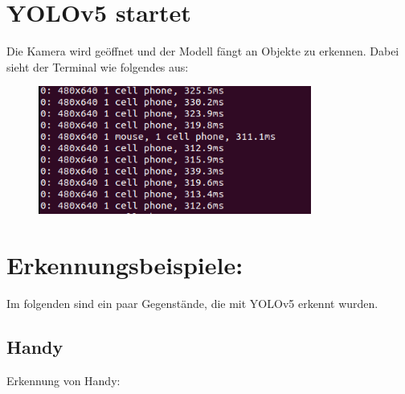 \documentclass{article}
\begin{document}


\clearpage
\section{YOLOv5 startet}
Die Kamera wird geöffnet und der Modell fängt an Objekte zu erkennen.
Dabei sieht der Terminal wie folgendes aus: 
\begin{figure}[h!]
    \centering
    \includegraphics[width=0.8\textwidth]{Bilder/terminalErgebnisse.png}
\end{figure}

\section{Erkennungsbeispiele:}
Im folgenden sind ein paar Gegenstände, die mit YOLOv5 erkennt wurden.
\subsection{Handy}
Erkennung von Handy: 
\end{document}
